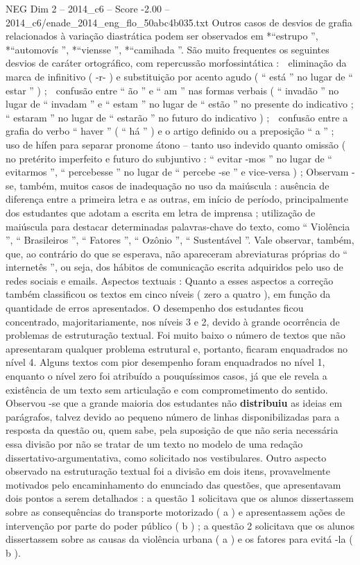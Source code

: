 \begin{textsample}{NEG Dim 2 – 2014\_c6 – Score -2.00 – 2014\_c6/enade\_2014\_eng\_flo\_50abc4b035.txt}
Outros casos de desvios de grafia relacionados à variação diastrática podem ser observados em *“estrupo ”, *“automovís ”, *“viensse ”, *“camihada ”.
São muito frequentes os seguintes desvios de caráter ortográfico, com repercussão morfossintática :  eliminação da marca de infinitivo ( -r- ) e substituição por acento agudo ( “ está ” no lugar de “ estar ” ) ;  confusão entre “ ão ” e “ am ” nas formas verbais ( “ invadão ” no lugar de “ invadam ” e “ estam ” no lugar de “ estão ” no presente do indicativo ; “ estaram ” no lugar de “ estarão ” no futuro do indicativo ) ;  confusão entre a grafia do verbo “ haver ” ( “ há ” ) e o artigo definido ou a preposição “ a ” ;  uso de hífen para separar pronome átono – tanto uso indevido quanto omissão ( no pretérito imperfeito e futuro do subjuntivo : “ evitar -mos ” no lugar de “ evitarmos ”, “ percebesse ” no lugar de “ percebe -se ” e vice-versa ) ; Observam -se, também, muitos casos de inadequação no uso da maiúscula : ausência de diferença entre a primeira letra e as outras, em início de período, principalmente dos estudantes que adotam a escrita em letra de imprensa ; utilização de maiúscula para destacar determinadas palavras-chave do texto, como “ Violência ”, “ Brasileiros ”, “ Fatores ”, “ Ozônio ”, “ Sustentável ”.
Vale observar, também, que, ao contrário do que se esperava, não apareceram abreviaturas próprias do “ internetês ”, ou seja, dos hábitos de comunicação escrita adquiridos pelo uso de redes sociais e emails.
Aspectos textuais : Quanto a esses aspectos a correção também classificou os textos em cinco níveis ( zero a quatro ), em função da quantidade de erros apresentados.
O desempenho dos estudantes ficou concentrado, majoritariamente, nos níveis 3 e 2, devido à grande ocorrência de problemas de estruturação textual.
Foi muito baixo o número de textos que não apresentaram qualquer problema estrutural e, portanto, ficaram enquadrados no nível 4.
Alguns textos com pior desempenho foram enquadrados no nível 1, enquanto o nível zero foi atribuído a pouquíssimos casos, já que ele revela a existência de um texto sem articulação e com comprometimento do sentido.
Observou -se que a grande maioria dos estudantes não \textbf{distribuiu} as ideias em parágrafos, talvez devido ao pequeno número de linhas disponibilizadas para a resposta da questão ou, quem sabe, pela suposição de que não seria necessária essa divisão por não se tratar de um texto no modelo de uma redação dissertativo-argumentativa, como solicitado nos vestibulares.
Outro aspecto observado na estruturação textual foi a divisão em dois itens, provavelmente motivados pelo encaminhamento do enunciado das questões, que apresentavam dois pontos a serem detalhados : a questão 1 solicitava que os alunos dissertassem sobre as consequências do transporte motorizado ( a ) e apresentassem ações de intervenção por parte do poder público ( b ) ; a questão 2 solicitava que os alunos dissertassem sobre as causas da violência urbana ( a ) e os fatores para evitá -la ( b ).

\end{textsample}
